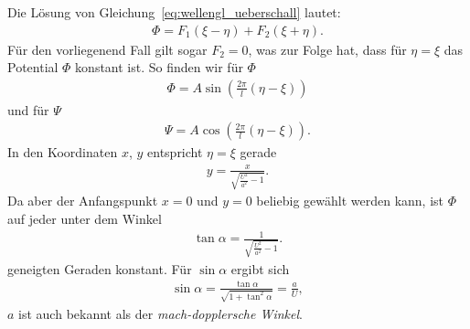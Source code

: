 Die Lösung von Gleichung~\eqref{eq:wellengl_ueberschall} lautet:
\begin{align*}
    \Phi
    =
    F_1(\xi-\eta)
    +
    F_2(\xi+\eta).
\end{align*}
Für den vorliegenend Fall gilt sogar $F_2 = 0$, 
was zur Folge hat, dass für $\eta = \xi$ das Potential
$\Phi$ konstant ist.
So finden wir für $\Phi$
\begin{align*}
    \Phi
    =
    A \sin\left(
        \frac{2\pi}{l}
        (\eta-\xi)
    \right)
\end{align*}
und für $\Psi$
\begin{align*}
    \Psi
    =
    A \cos\left(
        \frac{2\pi}{l}
        (\eta-\xi)
    \right).
\end{align*}
In den Koordinaten $x$, $y$ entspricht $\eta = \xi$ gerade 
\begin{align*}
    y
    =
    \frac{x}{\sqrt{\frac{U^2}{a^2}-1}}.
\end{align*} 
Da aber der Anfangspunkt $x = 0$ und $y = 0$ beliebig gewählt
werden kann, ist $\Phi$ auf jeder unter dem Winkel
\begin{align*}
    \tan \alpha
    =
    \frac{1}{\sqrt{\frac{U^2}{a^2}-1}}.
\end{align*}
geneigten Geraden konstant.
Für $\sin \alpha$ ergibt sich
\begin{align*}
    \sin \alpha
    =
    \frac{\tan \alpha}{\sqrt{1 + \tan^2 \alpha}}
    =
    \frac{a}{U},
\end{align*}
$a$ ist auch bekannt als der \emph{mach-dopplersche Winkel}.
%
%

